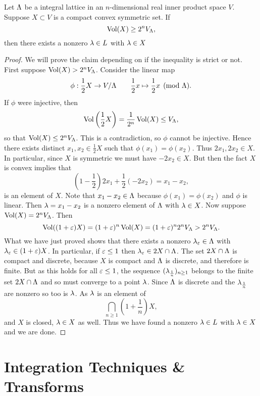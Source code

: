     \begin{theorem*}
      Let $\Lambda$ be a integral lattice in an $n$-dimensional real inner product space $V$. Suppose $X \subset V$ is a compact convex symmetric set. If
      \[
        \operatorname{\mathrm{Vol}}(X) \ge 2^{n}V_{\Lambda},
      \]
      then there exists a nonzero $\lambda \in L$ with $\lambda \in X$ 
    \end{theorem*}
    \begin{proof}
      We will prove the claim depending on if the inequality is strict or not. First suppose $\operatorname{\mathrm{Vol}}(X) > 2^{n}V_{\Lambda}$. Consider the linear map
      \[
        \phi:\frac{1}{2}X \to V/\Lambda \qquad \frac{1}{2}x \mapsto \frac{1}{2}x \pmod{\Lambda}.
      \]
      If $\phi$ were injective, then
      \[
        \operatorname{\mathrm{Vol}}\left(\frac{1}{2}X\right) = \frac{1}{2^{n}}\operatorname{\mathrm{Vol}}(X) \le V_{\Lambda}, 
      \]
      so that $\operatorname{\mathrm{Vol}}(X) \le  2^{n}V_{\Lambda}$. This is a contradiction, so $\phi$ cannot be injective. Hence there exists distinct $x_{1},x_{2} \in \frac{1}{2}X$ such that $\phi(x_{1}) = \phi(x_{2})$. Thus $2x_{1},2x_{2} \in X$. In particular, since $X$ is symmetric we must have $-2x_{2} \in X$. But then the fact $X$ is convex implies that
      \[
        \left(1-\frac{1}{2}\right)2x_{1}+\frac{1}{2}(-2x_{2}) = x_{1}-x_{2},
      \]
      is an element of $X$. Note that $x_{1}-x_{2} \in \Lambda$ because $\phi(x_{1}) = \phi(x_{2})$ and $\phi$ is linear. Then $\lambda = x_{1}-x_{2}$ is a nonzero element of $\Lambda$ with $\lambda \in X$. Now suppose $\operatorname{\mathrm{Vol}}(X) = 2^{n}V_{\Lambda}$. Then
      \[
        \operatorname{\mathrm{Vol}}((1+\varepsilon)X) = (1+\varepsilon)^{n}\operatorname{\mathrm{Vol}}(X) = (1+\varepsilon)^{n}2^{n}V_{\Lambda} > 2^{n}V_{\Lambda}.
      \]
      What we have just proved shows that there exists a nonzero $\lambda_{\varepsilon} \in \Lambda$ with $\lambda_{\varepsilon} \in (1+\varepsilon)X$. In particular, if $\varepsilon \le 1$ then $\lambda_{\varepsilon} \in 2X \cap \Lambda$. The set $2X \cap \Lambda$ is compact and discrete, because $X$ is compact and $\Lambda$ is discrete, and therefore is finite. But as this holds for all $\varepsilon \le 1$, the sequence $(\lambda_{\frac{1}{n}})_{n \ge 1}$ belongs to the finite set $2X \cap \Lambda$ and so must converge to a point $\lambda$. Since $\Lambda$ is discrete and the $\lambda_{\frac{1}{n}}$ are nonzero so too is $\lambda$. As $\lambda$ is an element of
      \[
        \bigcap_{n \ge 1}\left(1+\frac{1}{n}\right)X,
      \]
      and $X$ is closed, $\lambda \in X$ as well. Thus we have found a nonzero $\lambda \in L$ with $\lambda \in X$ and we are done.
    \end{proof}
  \section{Integration Techniques \& Transforms}
